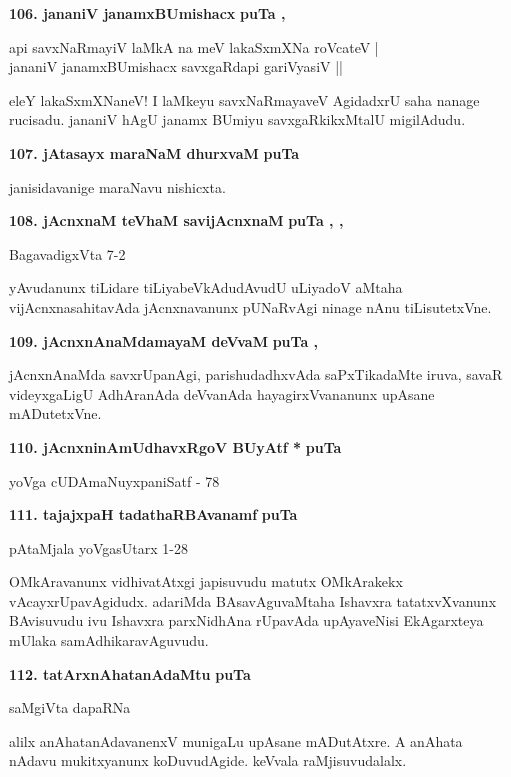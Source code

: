 \medskip
\noindent
\textbf{106. jananiV janamxBUmishacx} \hfill{\bf puTa \pageref{101}, \pageref{103d}}

\begin{shloka}
api savxNaRmayiV laMkA na meV lakaSxmXNa roVcateV |\\
jananiV janamxBUmishacx savxgaRdapi gariVyasiV ||
\end{shloka}

eleY lakaSxmXNaneV! I laMkeyu savxNaRmayaveV AgidadxrU saha nanage rucisadu. jananiV hAgU janamx BUmiyu savxgaRkikxMtalU migilAdudu.

\medskip
\noindent
\textbf{107. jAtasayx maraNaM dhurxvaM} \hfill{\bf puTa \pageref{122a}}

\smallskip
janisidavanige maraNavu nishicxta.

\medskip
\noindent
\textbf{108. jAcnxnaM teVhaM savijAcnxnaM} \hfill{\bf puTa \pageref{page19b}, \pageref{72}, \pageref{102b}}

\hfill{BagavadigxVta 7-2}

yAvudanunx tiLidare tiLiyabeVkAdudAvudU uLiyadoV aMtaha vijAcnxnasahitavAda jAcnxnavanunx pUNaRvAgi ninage nAnu tiLisutetxVne.

\medskip
\noindent
\textbf{109. jAcnxnAnaMdamayaM deVvaM} \hfill{\bf puTa \pageref{80c}, \pageref{102c}}

\smallskip
jAcnxnAnaMda savxrUpanAgi, parishudadhxvAda saPxTikadaMte iruva, savaR videyxgaLigU AdhAranAda deVvanAda hayagirxVvananunx upAsane mADutetxVne.

\medskip
\noindent
\textbf{110. jAcnxninAmUdhavxRgoV BUyAtf *} \hfill{\bf puTa \pageref{133}}

\hfill{yoVga cUDAmaNuyxpaniSatf - 78}

\medskip
\noindent
\textbf{111. tajajxpaH tadathaRBAvanamf} \hfill{\bf puTa \pageref{147b}}

\hfill{pAtaMjala yoVgasUtarx 1-28}

\smallskip
OMkAravanunx vidhivatAtxgi japisuvudu matutx OMkArakekx vAcayxrUpavAgidudx. adariMda BAsavAguvaMtaha Ishavxra tatatxvXvanunx BAvisuvudu ivu Ishavxra parxNidhAna rUpavAda upAyaveNisi EkAgarxteya mUlaka samAdhikaravAguvudu.

\medskip
\noindent
\textbf{112. tatArxnAhatanAdaMtu} \hfill{\bf puTa \pageref{151}}

\hfill{saMgiVta dapaRNa}

\smallskip
alilx anAhatanAdavanenxV munigaLu upAsane mADutAtxre. A anAhata nAdavu mukitxyanunx koDuvudAgide. keVvala raMjisuvudalalx.

